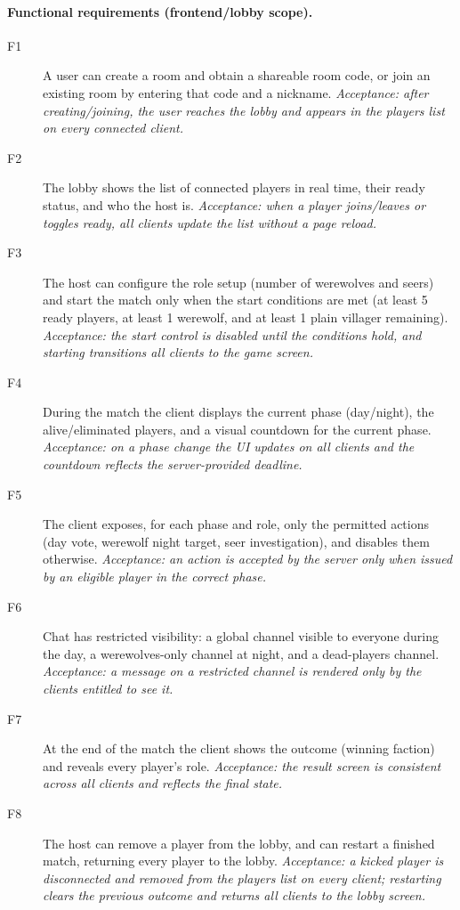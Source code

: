 \documentclass{scrartcl}
\begin{document}
\paragraph{Functional requirements (frontend/lobby scope).}
\begin{description}
  \item[F1] A user can create a room and obtain a shareable room code,
  or join an existing room by entering that code and a nickname.
  \emph{Acceptance: after creating/joining, the user reaches the lobby
  and appears in the players list on every connected client.}

  \item[F2] The lobby shows the list of connected players in real time,
  their ready status, and who the host is. \emph{Acceptance: when a
  player joins/leaves or toggles ready, all clients update the list
  without a page reload.}

  \item[F3] The host can configure the role setup (number of werewolves
  and seers) and start the match only when the start conditions are met
  (at least 5 ready players, at least 1 werewolf, and at least 1 plain
  villager remaining). \emph{Acceptance: the start control
  is disabled until the conditions hold, and starting transitions all
  clients to the game screen.}

  \item[F4] During the match the client displays the current phase
  (day/night), the alive/eliminated players, and a visual countdown for
  the current phase. \emph{Acceptance: on a phase change the UI updates
  on all clients and the countdown reflects the server-provided
  deadline.}

  \item[F5] The client exposes, for each phase and role, only the
  permitted actions (day vote, werewolf night target, seer
  investigation), and disables them otherwise. \emph{Acceptance: an
  action is accepted by the server only when issued by an eligible
  player in the correct phase.}

  \item[F6] Chat has restricted visibility: a global channel visible to
  everyone during the day, a werewolves-only channel at night, and a
  dead-players channel. \emph{Acceptance: a message on a restricted
  channel is rendered only by the clients entitled to see it.}

  \item[F7] At the end of the match the client shows the outcome
  (winning faction) and reveals every player's role. \emph{Acceptance:
  the result screen is consistent across all clients and reflects the
  final state.}

  \item[F8] The host can remove a player from the lobby, and can restart
  a finished match, returning every player to the lobby. \emph{Acceptance:
  a kicked player is disconnected and removed from the players list on
  every client; restarting clears the previous outcome and returns all
  clients to the lobby screen.}

\end{description}
\end{document}
